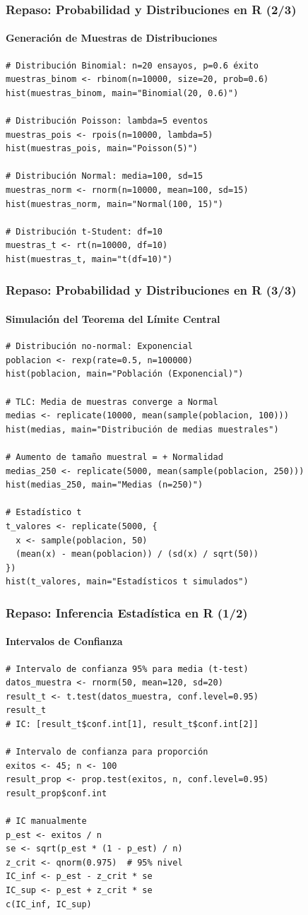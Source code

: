 \documentclass[aspectratio=169,11pt]{beamer}
\begin{document}
\begin{frame}[fragile]
\frametitle{Repaso: Probabilidad y Distribuciones en R (2/3)}
\framesubtitle{Generación de Muestras de Distribuciones}
\begin{lstlisting}
# Distribución Binomial: n=20 ensayos, p=0.6 éxito
muestras_binom <- rbinom(n=10000, size=20, prob=0.6)
hist(muestras_binom, main="Binomial(20, 0.6)")

# Distribución Poisson: lambda=5 eventos
muestras_pois <- rpois(n=10000, lambda=5)
hist(muestras_pois, main="Poisson(5)")

# Distribución Normal: media=100, sd=15
muestras_norm <- rnorm(n=10000, mean=100, sd=15)
hist(muestras_norm, main="Normal(100, 15)")

# Distribución t-Student: df=10
muestras_t <- rt(n=10000, df=10)
hist(muestras_t, main="t(df=10)")
\end{lstlisting}
\end{frame}

\begin{frame}[fragile]
\frametitle{Repaso: Probabilidad y Distribuciones en R (3/3)}
\framesubtitle{Simulación del Teorema del Límite Central}
\begin{lstlisting}
# Distribución no-normal: Exponencial
poblacion <- rexp(rate=0.5, n=100000)
hist(poblacion, main="Población (Exponencial)")

# TLC: Media de muestras converge a Normal
medias <- replicate(10000, mean(sample(poblacion, 100)))
hist(medias, main="Distribución de medias muestrales")

# Aumento de tamaño muestral = + Normalidad
medias_250 <- replicate(5000, mean(sample(poblacion, 250)))
hist(medias_250, main="Medias (n=250)")

# Estadístico t
t_valores <- replicate(5000, {
  x <- sample(poblacion, 50)
  (mean(x) - mean(poblacion)) / (sd(x) / sqrt(50))
})
hist(t_valores, main="Estadísticos t simulados")
\end{lstlisting}
\end{frame}

\begin{frame}[fragile]
\frametitle{Repaso: Inferencia Estadística en R (1/2)}
\framesubtitle{Intervalos de Confianza}
\begin{lstlisting}
# Intervalo de confianza 95% para media (t-test)
datos_muestra <- rnorm(50, mean=120, sd=20)
result_t <- t.test(datos_muestra, conf.level=0.95)
result_t
# IC: [result_t$conf.int[1], result_t$conf.int[2]]

# Intervalo de confianza para proporción
exitos <- 45; n <- 100
result_prop <- prop.test(exitos, n, conf.level=0.95)
result_prop$conf.int

# IC manualmente
p_est <- exitos / n
se <- sqrt(p_est * (1 - p_est) / n)
z_crit <- qnorm(0.975)  # 95% nivel
IC_inf <- p_est - z_crit * se
IC_sup <- p_est + z_crit * se
c(IC_inf, IC_sup)
\end{lstlisting}
\end{frame}
\end{document}
